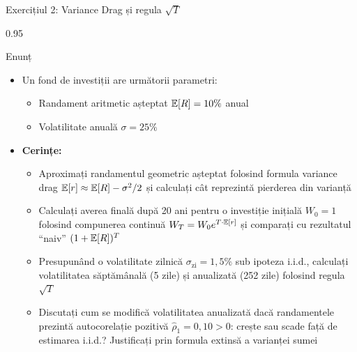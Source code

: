 \documentclass[9pt, aspectratio=169, t]{beamer}
\begin{document}
\begin{frame}[shrink=25]{Exercițiul 2: Variance Drag și regula $\sqrt{T}$}
\begin{cminipage}{0.95\textwidth}
\begin{block}{Enunț}
\begin{itemize}\setlength{\itemsep}{0pt}
    \item Un fond de investiții are următorii parametri:
    \begin{itemize}\setlength{\itemsep}{0pt}
        \item Randament aritmetic așteptat $\mathbb{E}[R] = 10\%$ anual
        \item Volatilitate anuală $\sigma = 25\%$
    \end{itemize}
    \item \textbf{Cerințe:}
    \begin{itemize}\setlength{\itemsep}{0pt}
        \item Aproximați randamentul geometric așteptat folosind formula variance drag $\mathbb{E}[r] \approx \mathbb{E}[R] - \sigma^2/2$ și calculați cât reprezintă pierderea din varianță
        \item Calculați averea finală după 20 ani pentru o investiție inițială $W_0 = 1$ folosind compunerea continuă $W_T = W_0 e^{T \cdot \mathbb{E}[r]}$ și comparați cu rezultatul ``naiv'' $(1+\mathbb{E}[R])^T$
        \item Presupunând o volatilitate zilnică $\sigma_{\text{zi}} = 1{,}5\%$ sub ipoteza i.i.d., calculați volatilitatea săptămânală (5 zile) și anualizată (252 zile) folosind regula $\sqrt{T}$
        \item Discutați cum se modifică volatilitatea anualizată dacă randamentele prezintă autocorelație pozitivă $\hat\rho_1 = 0{,}10 > 0$: crește sau scade față de estimarea i.i.d.? Justificați prin formula extinsă a varianței sumei
    \end{itemize}
\end{itemize}
\end{block}
\end{cminipage}
\end{frame}
\end{document}
